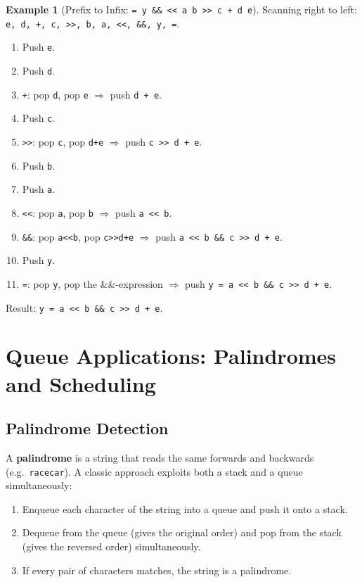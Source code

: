 \documentclass[11pt, a4paper, notitlepage]{report}
\theoremstyle{definition}
\theoremstyle{remark}
\theoremstyle{definition}
\newtheorem{example}[theorem]{Example}
\begin{document}
\begin{example}[Prefix to Infix: \texttt{= y \&\& << a b >> c + d e}]
\label{ex:prefix-to-infix}
Scanning right to left: \texttt{e, d, +, c, >>, b, a, <<, \&\&, y, =}.

\begin{enumerate}
  \item Push \texttt{e}.
  \item Push \texttt{d}.
  \item \texttt{+}: pop \texttt{d}, pop \texttt{e} $\Rightarrow$ push \texttt{d + e}.
  \item Push \texttt{c}.
  \item \texttt{>>}: pop \texttt{c}, pop \texttt{d+e} $\Rightarrow$ push \texttt{c >> d + e}.
  \item Push \texttt{b}.
  \item Push \texttt{a}.
  \item \texttt{<<}: pop \texttt{a}, pop \texttt{b} $\Rightarrow$ push \texttt{a << b}.
  \item \texttt{\&\&}: pop \texttt{a<<b}, pop \texttt{c>>d+e}
        $\Rightarrow$ push \texttt{a << b \&\& c >> d + e}.
  \item Push \texttt{y}.
  \item \texttt{=}: pop \texttt{y}, pop the \&\&-expression
        $\Rightarrow$ push \texttt{y = a << b \&\& c >> d + e}.
\end{enumerate}

Result: \texttt{y = a << b \&\& c >> d + e}.
\end{example}

\section{Queue Applications: Palindromes and Scheduling}
\label{sec:queue-applications-ext}

\subsection{Palindrome Detection}
\label{subsec:palindrome}

A \textbf{palindrome} is a string that reads the same forwards and backwards (e.g.\
\texttt{racecar}).  A classic approach exploits both a stack and a queue simultaneously:

\begin{enumerate}
  \item Enqueue each character of the string into a queue and push it onto a stack.
  \item Dequeue from the queue (gives the original order) and pop from the stack (gives
        the reversed order) simultaneously.
  \item If every pair of characters matches, the string is a palindrome.
\end{enumerate}
\end{document}
